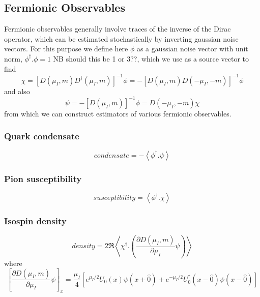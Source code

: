 \documentclass[a4paper,12pt]{article}
\begin{document}
\subsection{Fermionic Observables}
Fermionic observables generally involve traces of the inverse of the Dirac operator, which can be estimated stochastically by 
inverting gaussian noise vectors. For this purpose we define here $\phi$ as a gaussian noise vector with unit norm, $\phi^{\dagger}.\phi=1$ NB should this be 1 or 3??,
which we use as a source vector to find
\begin{equation}
 \chi = \left[D(\mu_I,m) D^{\dagger}(\mu_I,m)\right]^{-1} \phi = -\left[D(\mu_I,m) D(-\mu_I,-m)\right]^{-1} \phi
\end{equation}
and also
\begin{equation}
 \psi = -\left[D(\mu_I,m)\right]^{-1} \phi = D(-\mu_I,-m) \chi
\end{equation}
from which we can construct estimators of various fermionic observables.

\subsubsection{Quark condensate}
\begin{equation}
 condensate = -\left\langle \phi^{\dagger}.\psi \right\rangle
\end{equation}

\subsubsection{Pion susceptibility}
\begin{equation}
 susceptibility = \left\langle \phi^{\dagger}.\chi \right\rangle
\end{equation}

\subsubsection{Isospin density}
\begin{equation}
 density = 2 \Re \left\langle \chi^{\dagger}.\left(\frac{\partial D(\mu_I,m)}{\partial\mu_I}\psi\right) \right\rangle
\end{equation}
where
\begin{equation}
 \left[\frac{\partial D(\mu_I,m)}{\partial\mu_I}\psi\right]_x =\frac{\mu_I}{4}\left[ e^{\mu_I/2} U_0(x) \psi(x+\hat0) + e^{-\mu_I/2} U^{\dagger}_0(x-\hat0) \psi(x-\hat0)\right]
\end{equation}
\end{document}

